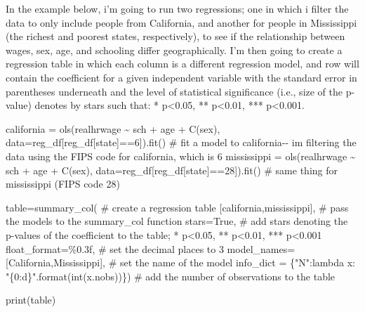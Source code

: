 \documentclass[
  letterpaper,
  DIV=11,
  numbers=noendperiod]{scrreprt}
\newenvironment{Shaded}{\begin{snugshade}}{\end{snugshade}}
\newcommand{\BuiltInTok}[1]{\textcolor[rgb]{0.00,0.23,0.31}{#1}}
\newcommand{\CommentTok}[1]{\textcolor[rgb]{0.37,0.37,0.37}{#1}}
\newcommand{\DecValTok}[1]{\textcolor[rgb]{0.68,0.00,0.00}{#1}}
\newcommand{\KeywordTok}[1]{\textcolor[rgb]{0.00,0.23,0.31}{#1}}
\newcommand{\NormalTok}[1]{\textcolor[rgb]{0.00,0.23,0.31}{#1}}
\newcommand{\OperatorTok}[1]{\textcolor[rgb]{0.37,0.37,0.37}{#1}}
\newcommand{\SpecialCharTok}[1]{\textcolor[rgb]{0.37,0.37,0.37}{#1}}
\newcommand{\StringTok}[1]{\textcolor[rgb]{0.13,0.47,0.30}{#1}}
\newcommand{\VariableTok}[1]{\textcolor[rgb]{0.07,0.07,0.07}{#1}}
\begin{document}
In the example below, i'm going to run two regressions; one in which i
filter the data to only include people from California, and another for
people in Mississippi (the richest and poorest states, respectively), to
see if the relationship between wages, sex, age, and schooling differ
geographically. I'm then going to create a regression table in which
each column is a different regression model, and row will contain the
coefficient for a given independent variable with the standard error in
parentheses underneath and the level of statistical significance (i.e.,
size of the p-value) denotes by stars such that: * p\textless0.05, **
p\textless0.01, *** p\textless0.001.

\begin{Shaded}
\begin{Highlighting}[]
\NormalTok{california }\OperatorTok{=}\NormalTok{ ols(}\StringTok{\textquotesingle{}realhrwage \textasciitilde{}  sch + age + C(sex)\textquotesingle{}}\NormalTok{, data}\OperatorTok{=}\NormalTok{reg\_df[reg\_df[}\StringTok{\textquotesingle{}state\textquotesingle{}}\NormalTok{]}\OperatorTok{==}\DecValTok{6}\NormalTok{]).fit()  }\CommentTok{\# fit a model to california{-}{-} i\textquotesingle{}m filtering the data using the FIPS code for california, which is 6}
\NormalTok{mississippi }\OperatorTok{=}\NormalTok{ ols(}\StringTok{\textquotesingle{}realhrwage \textasciitilde{}  sch + age + C(sex)\textquotesingle{}}\NormalTok{, data}\OperatorTok{=}\NormalTok{reg\_df[reg\_df[}\StringTok{\textquotesingle{}state\textquotesingle{}}\NormalTok{]}\OperatorTok{==}\DecValTok{28}\NormalTok{]).fit()  }\CommentTok{\# same thing for mississippi (FIPS code 28)}

\NormalTok{table}\OperatorTok{=}\NormalTok{summary\_col( }\CommentTok{\# create a regression table }
\NormalTok{    [california,mississippi], }\CommentTok{\# pass the models to the summary\_col function}
\NormalTok{    stars}\OperatorTok{=}\VariableTok{True}\NormalTok{, }\CommentTok{\# add stars denoting the p{-}values of the coefficient to the table; * p\textless{}0.05, ** p\textless{}0.01, *** p\textless{}0.001}
\NormalTok{    float\_format}\OperatorTok{=}\StringTok{\textquotesingle{}}\SpecialCharTok{\%0.3f}\StringTok{\textquotesingle{}}\NormalTok{, }\CommentTok{\# set the decimal places to 3}
\NormalTok{    model\_names}\OperatorTok{=}\NormalTok{[}\StringTok{\textquotesingle{}California\textquotesingle{}}\NormalTok{,}\StringTok{\textquotesingle{}Mississippi\textquotesingle{}}\NormalTok{], }\CommentTok{\# set the name of the model}
\NormalTok{    info\_dict }\OperatorTok{=}\NormalTok{ \{}\StringTok{"N"}\NormalTok{:}\KeywordTok{lambda}\NormalTok{ x: }\StringTok{"}\SpecialCharTok{\{0:d\}}\StringTok{"}\NormalTok{.}\BuiltInTok{format}\NormalTok{(}\BuiltInTok{int}\NormalTok{(x.nobs))\}) }\CommentTok{\# add the number of observations to the table}

\BuiltInTok{print}\NormalTok{(table)}
\end{Highlighting}
\end{Shaded}
\end{document}
